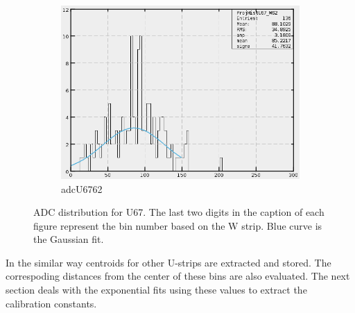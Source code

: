 \begin{figure}[h]
\begin{subfigure}[h]{0.3\textwidth}
        \includegraphics[width=\textwidth, keepaspectratio = true]{adcU67_62}
        \caption{adcU6762}
        \label{fig:adcU67_62}
    \end{subfigure}
    \caption{ADC distribution for U67. The last two digits in the caption of each figure represent the bin number based on the W strip.
    Blue curve is the Gaussian fit.}
    \label{fig:adcU5}
\end{figure}
\FloatBarrier
In the similar way centroids for other U-strips are extracted and stored. The correspoding distances from the center of these bins
are also evaluated. The next section deals with the exponential fits using these values to extract the calibration constants.

\FloatBarrier
